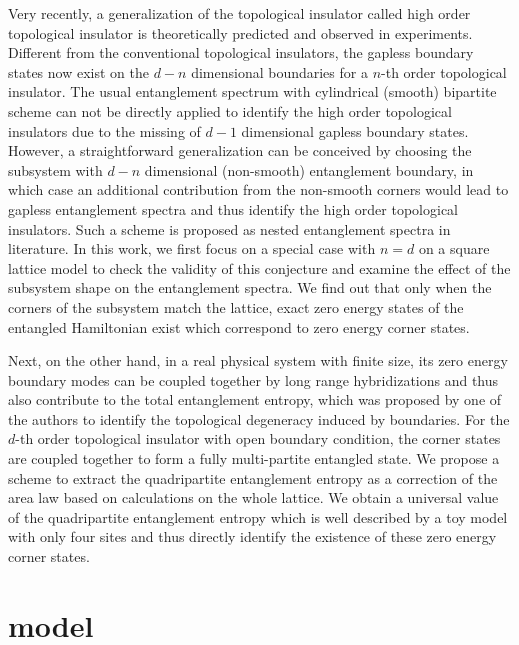 \documentclass[aps,twocolumn,superscriptaddress]{revtex4-1}
\begin{document}
Very recently, a generalization of the topological insulator called high order topological insulator 
is theoretically predicted and observed in experiments.
\cite{}
Different from the conventional topological insulators, the gapless boundary states now exist 
on the $d-n$ dimensional boundaries for a $n$-th order topological insulator. 
The usual entanglement spectrum with cylindrical (smooth) bipartite scheme can not be directly applied 
to identify the high order topological insulators due to the missing of $d-1$ dimensional gapless boundary states.
However, a straightforward generalization can be conceived by choosing the subsystem 
with $d-n$ dimensional (non-smooth) entanglement boundary, in which case an additional 
contribution from the non-smooth corners \cite{Laflorencie2017} would lead to gapless entanglement spectra
and thus identify the high order topological insulators.
Such a scheme is proposed as nested entanglement spectra in literature. \cite{Schindler2017} 
In this work, we first focus on a special case with $n=d$ on a square lattice model 
to check the validity of this conjecture and examine the effect of the subsystem shape 
on the entanglement spectra. 
We find out that only when the corners of the subsystem match the lattice,
exact zero energy states of the entangled Hamiltonian exist 
which correspond to zero energy corner states. 

Next, on the other hand, in a real physical system with finite size, 
its zero energy boundary modes can be coupled together by long range hybridizations
and thus also contribute to the total entanglement entropy, which was proposed 
by one of the authors to identify the topological degeneracy induced by boundaries. \cite{Wang2015}
For the $d$-th order topological insulator with open boundary condition, 
the corner states are coupled together to form a fully multi-partite entangled state. 
We propose a scheme to extract the quadripartite entanglement entropy 
as a correction of the area law based on calculations on the whole lattice. 
We obtain a universal value of the quadripartite entanglement entropy 
which is well described by a toy model with only four sites
and thus directly identify the existence of these zero energy corner states. 


\section{model}
\end{document}
